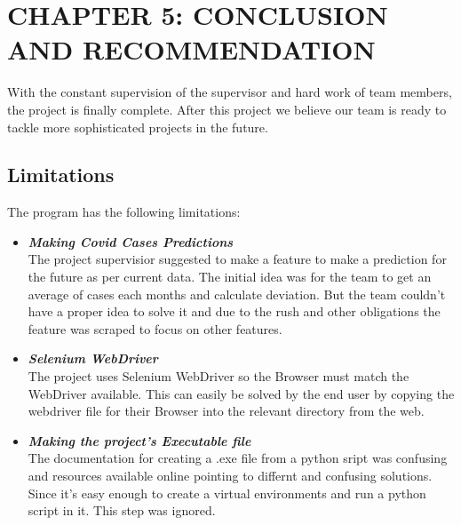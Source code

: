 \documentclass[12pt]{article}
\begin{document}
\clearpage

\section{CHAPTER 5: CONCLUSION AND RECOMMENDATION}
With the constant supervision of the supervisor and hard work of team members, the project is finally complete. After this project we believe our team is 
ready to tackle more sophisticated projects in the future.

\subsection{Limitations}
\vspace*{5mm}
The program has the following limitations:
\begin{itemize}
    \item \textit{\textbf{Making Covid Cases Predictions}}\\
        The project supervisior suggested to make a feature to make a prediction for the future as per current data. The initial idea was for the team to
        get an average of cases each months and calculate deviation. But the team couldn't have a proper idea to solve it and due to the rush and
        other obligations the feature was scraped to focus on other features.
    \item \textit{\textbf{Selenium WebDriver}}\\
        The project uses Selenium WebDriver so the Browser must match the WebDriver available. This can easily be solved by the end user by copying the
        webdriver file for their Browser into the relevant directory from the web.
    \item \textit{\textbf{Making the project's Executable file}}\\
        The documentation for creating a .exe file from a python sript was confusing and resources available online pointing to differnt and confusing solutions.
        Since it's easy enough to create a virtual environments and run a python script in it. This step was ignored. 
\end{itemize}
\vspace*{5mm}
\end{document}
